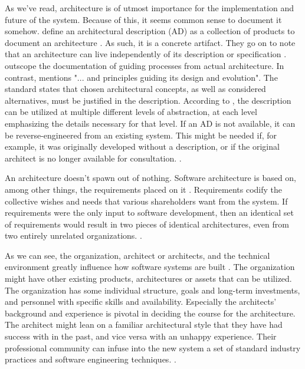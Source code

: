 \documentclass[utf8,english]{gradu3}
\begin{document}
As we've read, architecture is of utmost importance for the implementation and
future of the system. Because of this, it seems common sense to document
it somehow. \textcite[24]{Bass1998} define an architectural description (AD) as a
collection of products to document an architecture \parencite[3]{IEEE42010}. As such, it
is a concrete artifact. They go on to note that an architecture can live
independently of its description or specification \parencite[24]{Bass1998}. \textcite[27]{Bass1998}
outscope the documentation of guiding processes from actual architecture.  In
contrast, \textcite[3]{IEEE42010} mentions "... and principles guiding its design and
evolution". The standard states that chosen architectural concepts, as well as
considered alternatives, must be justified in the description. According to
\textcite[67]{IEEE12207}, the description can be utilized at multiple different levels of
abstraction, at each level emphasizing the details necessary for that level. If
an AD is not available, it can be reverse-engineered from an existing system.
This might be needed if, for example, it was originally developed without a
description, or if the original architect is no longer available for
consultation. \parencite[7]{IEEE42010}.

An architecture doesn't spawn out of nothing. Software architecture is based on,
among other things, the requirements placed on it \parencite{Bass1998}. Requirements
codify the collective wishes and needs that various shareholders want from the
system. If requirements were the only input to software development, then an
identical set of requirements would result in two pieces of identical
architectures, even from two entirely unrelated organizations. \parencite[5-9]{Bass1998}.

As we can see, the organization, architect or architects, and the technical
environment greatly influence how software systems are built \parencite{Bass1998}. The
organization might have other existing products, architectures or assets that
can be utilized. The organization has some individual structure, goals and
long-term investments, and personnel with specific skills and availability.
Especially the architects' background and experience is pivotal in deciding the
course for the architecture. The architect might lean on a familiar
architectural style that they have had success with in the past, and vice versa
with an unhappy experience. Their professional community can infuse into the new
system a set of standard industry practices and software engineering techniques.
\parencite[5-9]{Bass1998}.
\end{document}
